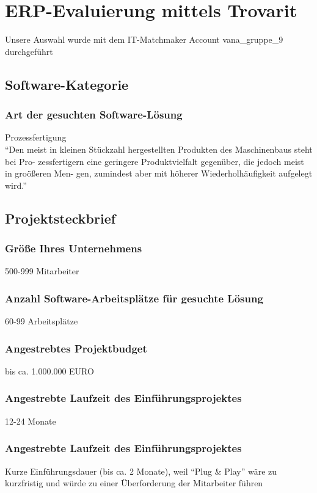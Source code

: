 \section{ERP-Evaluierung mittels Trovarit}
Unsere Auswahl wurde mit dem IT-Matchmaker Account vana\_gruppe\_9 durchgeführt


\subsection{Software-Kategorie}
\subsubsection{Art der gesuchten Software-Lösung}
Prozessfertigung\\
\enquote{Den meist in kleinen Stückzahl hergestellten Produkten des Maschinenbaus steht bei Pro- zessfertigern eine geringere Produktvielfalt gegenüber, die jedoch meist in groößeren Men- gen, zumindest aber mit höherer Wiederholhäufigkeit aufgelegt wird.} \cite{trovarit_prozessfertigung}

\subsection{Projektsteckbrief}
\subsubsection{Größe Ihres Unternehmens}
500-999 Mitarbeiter
\subsubsection{Anzahl Software-Arbeitsplätze für gesuchte Lösung}
60-99 Arbeitsplätze
\subsubsection{Angestrebtes Projektbudget}
bis ca. 1.000.000 EURO
\subsubsection{Angestrebte Laufzeit des Einführungsprojektes}
12-24 Monate
\subsubsection{Angestrebte Laufzeit des Einführungsprojektes}
Kurze Einführungsdauer (bis ca. 2 Monate), weil \enquote{Plug \& Play} wäre zu kurzfristig und würde zu einer Überforderung der Mitarbeiter führen
